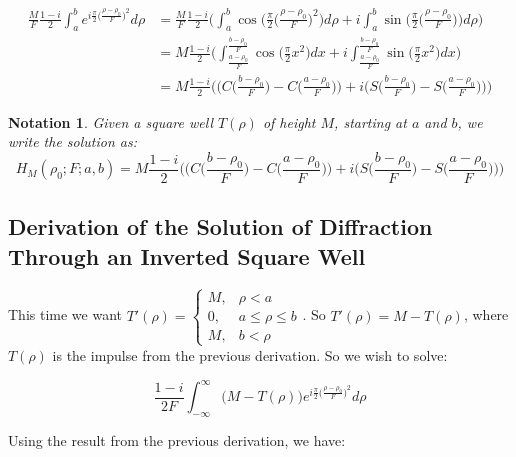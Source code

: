 \documentclass{article}
\theoremstyle{mystyle}
\newtheorem{notation}{Notation}[section]
\begin{document}
\begin{align}
\nonumber \frac{M}{F}\frac{1-i}{2}\int_{a}^{b}e^{i\frac{\pi}{2}\big(\frac{\rho-\rho_0}{F}\big)^2}d\rho &= \frac{M}{F}\frac{1-i}{2}\Bigg(\int_{a}^{b} \cos\bigg(\frac{\pi}{2}\big(\frac{\rho-\rho_0}{F}\big)^2\bigg)d\rho + i\int_{a}^{b} \sin\bigg(\frac{\pi}{2}\big(\frac{\rho-\rho_0}{F}\big)\bigg)d\rho\Bigg) \\
 &= M\frac{1-i}{2}\Bigg(\int_{\frac{a-\rho_0}{F}}^{\frac{b-\rho_0}{F}}\cos\bigg(\frac{\pi}{2}x^2\bigg)dx + i\int_{\frac{a-\rho_0}{F}}^{\frac{b-\rho_0}{F}}\sin\bigg(\frac{\pi}{2}x^2\bigg)dx\Bigg)\\
\nonumber &= M\frac{1-i}{2}\Bigg(\bigg(C\big(\frac{b-\rho_0}{F}\big)-C\big(\frac{a-\rho_0}{F}\big)\bigg)+i\bigg(S\big(\frac{b-\rho_0}{F}\big)-S\big(\frac{a-\rho_0}{F}\big)\bigg)\Bigg)
\end{align}

\begin{notation}
Given a square well $T(\rho)$ of height $M$, starting at $a$ and $b$, we write the solution as:
\begin{equation}
H_{M}(\rho_0;F;a,b) = M\frac{1-i}{2}\Bigg(\bigg(C\big(\frac{b-\rho_0}{F}\big)-C\big(\frac{a-\rho_0}{F}\big)\bigg)+i\bigg(S\big(\frac{b-\rho_0}{F}\big)-S\big(\frac{a-\rho_0}{F}\big)\bigg)\Bigg)
\end{equation}
\end{notation}

\subsection{Derivation of the Solution of Diffraction Through an Inverted Square Well}

This time we want $T'(\rho) = \begin{cases} M, & \rho<a \\ 0, & a\leq \rho \leq b \\ M, & b<\rho\end{cases}$. So $T'(\rho) = M - T(\rho)$, where $T(\rho)$ is the impulse from the previous derivation. So we wish to solve:

\begin{equation}
\frac{1-i}{2F}\int_{-\infty}^{\infty}\big(M-T(\rho)\big)e^{i\frac{\pi}{2}\big(\frac{\rho-\rho_0}{F}\big)^2}d\rho
\end{equation}

Using the result from the previous derivation, we have:
\end{document}
